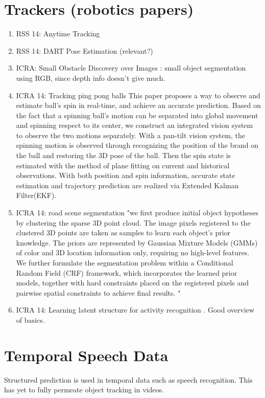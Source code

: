 \section{Trackers (robotics papers)}
\label{sec:trackers}
\begin{enumerate}
\item RSS 14: Anytime Tracking \cite{held2014combining}
\item RSS 14: DART Pose Estimation \cite{schmidt2014dart} (relevant?)
\item ICRA: Small Obstacle Discovery over Images \cite{kumar2014markov}: small object segmentation using RGB, since depth info doesn't give much.
\item ICRA 14: Tracking ping pong balls \cite{zhang2014spin} This paper proposes a way to observe and estimate ball's spin in real-time, and achieve an accurate prediction. Based on the fact that a spinning ball's motion can be separated into global movement and spinning respect to its center, we construct an integrated vision system to observe the two motions separately. With a pan-tilt vision system, the spinning motion is observed through recognizing the position of the brand on the ball and restoring the 3D pose of the ball. Then the spin state is estimated with the method of plane fitting on current and historical observations. With both position and spin information, accurate state estimation and trajectory prediction are realized via Extended Kalman Filter(EKF). 
\item ICRA 14: road scene segmentation \cite{huang2014road} "we first produce initial object hypotheses by clustering the sparse 3D point cloud. The image pixels registered to the clustered 3D points are taken as samples to learn each object's prior knowledge. The priors are represented by Gaussian Mixture Models (GMMs) of color and 3D location information only, requiring no high-level features. We further formulate the segmentation problem within a Conditional Random Field (CRF) framework, which incorporates the learned prior models, together with hard constraints placed on the registered pixels and pairwise spatial constraints to achieve final results. "
\item ICRA 14: Learning latent structure for activity recognition \cite{hu2014learning}. Good overview of basics.
\end{enumerate}
\section{Temporal Speech Data}
\label{sec:temporalspeech}
Structured prediction is used in temporal data such as speech recognition. This
has yet to fully permeate object tracking in videos.

